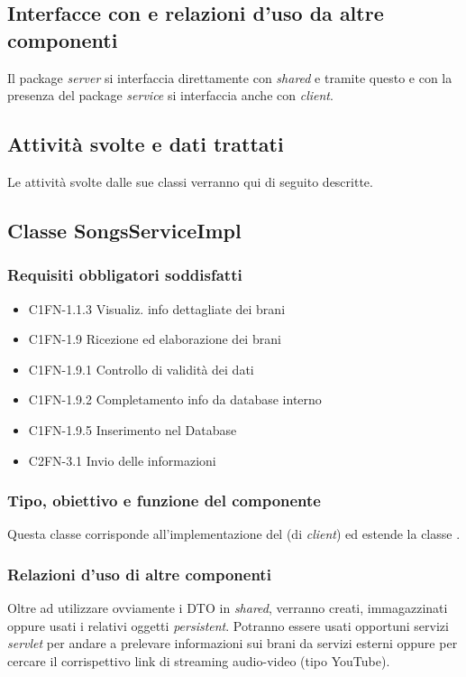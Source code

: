 \subsection*{Interfacce con e relazioni d'uso da altre componenti}
Il package \emph{server} si interfaccia direttamente con \emph{shared} e tramite
questo e con la presenza del package \emph{service} si interfaccia anche con
\emph{client}.

\subsection*{Attivit\`a svolte e dati trattati}
Le attivit\`a svolte dalle sue classi verranno qui di seguito descritte.

\subsection{Classe SongsServiceImpl}
\subsubsection*{Requisiti obbligatori soddisfatti}
\begin{itemize}
	\item C1FN-1.1.3 Visualiz. info dettagliate dei brani
	\item C1FN-1.9 Ricezione ed elaborazione dei brani
	\item C1FN-1.9.1 Controllo di validit\`a dei dati
	\item C1FN-1.9.2 Completamento info da database interno
	\item C1FN-1.9.5 Inserimento nel Database
	\item C2FN-3.1 Invio delle informazioni
\end{itemize}
\subsubsection*{Tipo, obiettivo e funzione del componente}
Questa classe corrisponde all'implementazione del  (di
\emph{client}) ed estende la classe .

\subsubsection*{Relazioni d'uso di altre componenti}
Oltre ad utilizzare ovviamente i DTO in \emph{shared}, verranno creati,
immagazzinati oppure usati i relativi oggetti \emph{persistent}.
Potranno essere usati opportuni servizi \emph{servlet} per andare a prelevare
informazioni sui brani da servizi esterni oppure per cercare il corrispettivo
link di streaming audio-video (tipo YouTube).

